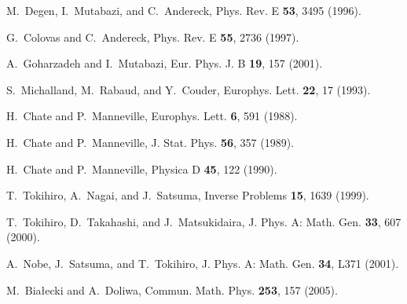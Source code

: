 \documentclass[aps,pre,preprint,floatfix]{revtex4}
\theoremstyle{plain} \newtheorem{defi}{Definition}[section]
\theoremstyle{plain} \newtheorem{prop}{Proposition}[section]
\theoremstyle{plain} \newtheorem{theor}{Theorem}[section]
\theoremstyle{plain} \newtheorem{lemma}{Lemma}[section]
\theoremstyle{plain} \newtheorem*{corol}{Corollary}
\theoremstyle{remark} \newtheorem*{rem}{Remark}
\theoremstyle{plain} \newtheorem{exer}{Exercise}[section]
\theoremstyle{remark} \newtheorem*{ans}{Answer}
\begin{document}
\begin{thebibliography}{9}
M.~Degen, I.~Mutabazi, and C.~Andereck,
\newblock Phys. Rev. E {\bf 53}, 3495 (1996).

G.~Colovas and C.~Andereck,
\newblock Phys. Rev. E {\bf 55}, 2736 (1997).

A.~Goharzadeh and I.~Mutabazi,
\newblock Eur. Phys. J. B {\bf 19}, 157 (2001).

S.~Michalland, M.~Rabaud, and Y.~Couder,
\newblock Europhys. Lett. {\bf 22}, 17 (1993).






H.~Chate and P.~Manneville,
\newblock Europhys. Lett. {\bf 6}, 591 (1988).

H.~Chate and P.~Manneville,
\newblock J. Stat. Phys. {\bf 56}, 357 (1989).

H.~Chate and P.~Manneville,
\newblock Physica D {\bf 45}, 122 (1990).







%




T.~Tokihiro, A.~Nagai, and J.~Satsuma,
\newblock Inverse Problems {\bf 15}, 1639 (1999).

T.~Tokihiro, D.~Takahashi, and J.~Matsukidaira,
\newblock J. Phys. A: Math. Gen. {\bf 33}, 607 (2000).

A.~Nobe, J.~Satsuma, and T.~Tokihiro,
\newblock J. Phys. A: Math. Gen. {\bf 34}, L371 (2001).

M.~Bia\l{}ecki and A.~Doliwa,
\newblock Commun. Math. Phys. {\bf 253}, 157 (2005).


\end{thebibliography}
\end{document}
